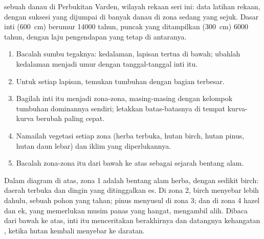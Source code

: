 \begin{omfigure}

{\small {} sebuah danau di Perbukitan Varden, wilayah rekaan seri
ini: data latihan rekaan, dengan suksesi yang dijumpai di banyak danau di zona
sedang yang sejuk. Dasar inti (\qty{600}{cm}) berumur \num{14000} tahun,
puncak yang ditampilkan (\qty{300}{cm}) \num{6000} tahun, dengan laju
pengendapan yang tetap di antaranya.}
\end{omfigure}

\begin{method}
\begin{enumerate}
  \item Bacalah sumbu tegaknya: kedalaman, lapisan tertua di bawah; ubahlah
        kedalaman menjadi umur dengan tanggal-tanggal inti itu.
  \item Untuk setiap lapisan, temukan tumbuhan dengan bagian terbesar.
  \item Bagilah inti itu menjadi zona-zona, masing-masing dengan kelompok
        tumbuhan dominannya sendiri; letakkan batas-batasnya di tempat
        kurva-kurva berubah paling cepat.
  \item Namailah vegetasi setiap zona (herba terbuka, hutan birch, hutan
        pinus, hutan daun lebar) dan iklim yang diperlukannya.
  \item Bacalah zona-zona itu dari bawah ke atas sebagai sejarah bentang
        alam.
\end{enumerate}
\end{method}

Dalam diagram di atas, zona 1 adalah bentang alam herba, dengan sedikit birch:
daerah terbuka dan dingin yang ditinggalkan es. Di zona 2, birch menyebar lebih
dahulu, sebuah pohon yang tahan; pinus menyusul di zona 3; dan di zona 4 hazel
dan ek, yang memerlukan musim panas yang hangat, mengambil alih. Dibaca dari
bawah ke atas, inti itu menceritakan berakhirnya  dan datangnya
kehangatan , ketika hutan kembali menyebar ke daratan.

